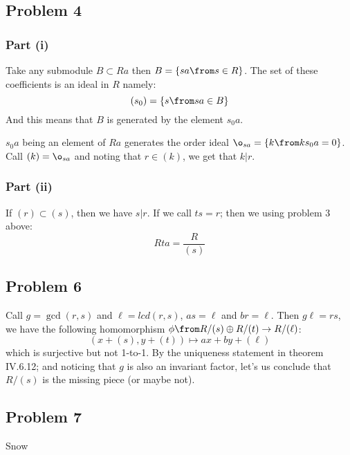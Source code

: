 \subsection*{Problem 4}
\subsubsection*{Part (i)}
Take any submodule $B\subset Ra$ then $B=\{sa \from s\in R\}$. The set of these coefficients is an ideal in $R$ namely:
$$(s_0) = \{s\from sa \in B\}$$
And this means that $B$ is generated by the element $s_0 a$. 

$s_0a$ being an element of $Ra$ generates the order ideal $\o_{sa}=\{k\from ks_0a =0\}$. Call $(k) = \o_{sa}$ and noting that $r\in (k)$, we get that $k|r$.

\subsubsection*{Part (ii)}
If $(r)\subset (s)$, then we have $s|r$. If we call $ts=r$; then we using problem 3 above:
$$Rta =\frac{R}{(s)}$$


\subsection*{Problem 6}
Call $g=\gcd(r,s)$ and $\ell = lcd(r,s)$, $as=\ell$ and $br=\ell$.  Then $g\ell = rs$, we have the following homomorphism $\phi\from R/(s)\oplus R/(t) \to R/(\ell)$:
$$(x+(s), y+(t)) \mapsto ax+by+(\ell)$$
which is surjective but not 1-to-1. By the uniqueness statement in theorem IV.6.12; and noticing that $g$ is also an invariant factor, let's us conclude that $R/(s)$ is the missing piece (or maybe not). 
\subsection*{Problem 7}
Snow
